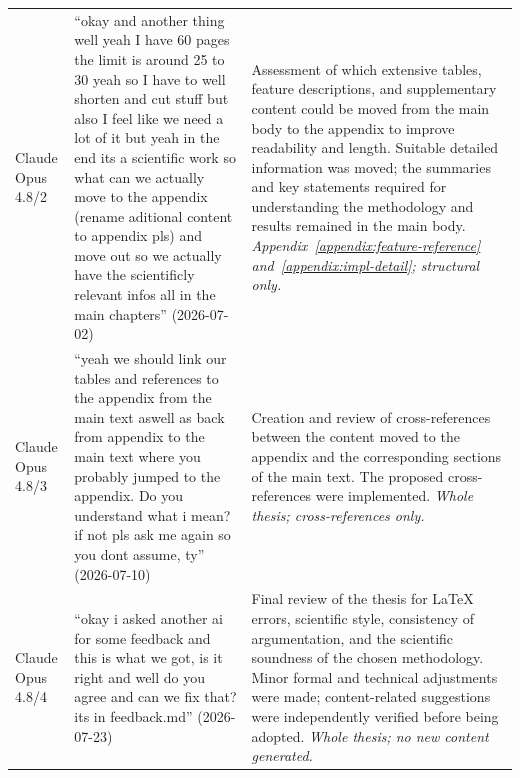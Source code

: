 {\begin{longtable}{p{} p{} p{}}
Claude Opus 4.8/2
& ``okay and another thing well yeah I have 60 pages the limit is around 25 to 30 yeah
so I have to well shorten and cut stuff but also I feel like we need a lot of it but
yeah in the end its a scientific work so what can we actually move to the appendix
(rename aditional content to appendix pls) and move out so we actually have the
scientificly relevant infos all in the main chapters'' (2026-07-02)
& Assessment of which extensive tables, feature descriptions, and supplementary content
could be moved from the main body to the appendix to improve readability and length.
Suitable detailed information was moved; the summaries and key statements required for
understanding the methodology and results remained in the main body. \newline
\emph{Appendix~\ref{appendix:feature-reference} and~\ref{appendix:impl-detail};
structural only.} \\

Claude Opus 4.8/3
& ``yeah we should link our tables and references to the appendix from the main text
aswell as back from appendix to the main text where you probably jumped to the appendix.
Do you understand what i mean? if not pls ask me again so you dont assume, ty''
(2026-07-10)
& Creation and review of cross-references between the content moved to the appendix and
the corresponding sections of the main text. The proposed cross-references were
implemented. \newline \emph{Whole thesis; cross-references only.} \\

Claude Opus 4.8/4
& ``okay i asked another ai for some feedback and this is what we got, is it right and
well do you agree and can we fix that? its in feedback.md'' (2026-07-23)
& Final review of the thesis for \LaTeX{} errors, scientific style, consistency of
argumentation, and the scientific soundness of the chosen methodology. Minor formal and
technical adjustments were made; content-related suggestions were independently verified
before being adopted. \newline \emph{Whole thesis; no new content generated.} \\


\end{longtable}}
